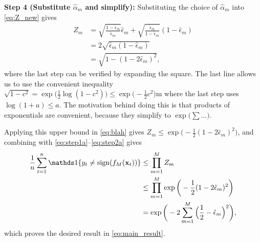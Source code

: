 \documentclass[english]{article}
\begin{document}
\medskip
{\noindent \bf Step 4 (Substitute $\hat{\alpha}_m$ and simplify):} Substituting the choice of $\hat{\alpha}_m$ into \eqref{eq:Z_new} gives
    \begin{align}
        Z_m &= \sqrt{\frac{1-\hat{\epsilon}_m}{\hat{\epsilon}_m}} \hat{\epsilon}_m + \sqrt{\frac{\hat{\epsilon}_m}{1-\hat{\epsilon}_m}}(1 - \hat{\epsilon}_m) \\
            &= 2\sqrt{ \hat{\epsilon}_m (1-\hat{\epsilon}_m) } \\
            &= \sqrt{ 1 - (1-2\hat{\epsilon}_m)^2 }, \label{eq:blah}
    \end{align}
    where the last step can be verified by expanding the square.  The last line allows us to use the convenient inequality $\sqrt{1-c^2} = \exp\big( \frac{1}{2}\log( 1 - c^2 ) \big) \le \exp\big( - \frac{1}{2} c^2 \big)$m where the last step uses $\log(1+a) \le a$.  The motivation behind doing this is that products of exponentials are convenient, because they simplify to $\exp\big(\sum\dotsc)$.

    Applying this upper bound in \eqref{eq:blah} gives $Z_m \le \exp\big( -\frac{1}{2} (1-2\hat{\epsilon}_m)^2 \big)$, and combining with \eqref{eq:step1a}--\eqref{eq:step2a} gives
    \begin{align*}
        \frac{1}{n}\sum_{t=1}^n\openone\{ y_t \ne \sign(f_M(\xv_t)) \} 
            &\le \prod_{m=1}^M Z_m \\
            &\le \prod_{m=1}^M \exp\bigg( -\frac{1}{2} (1-2\hat{\epsilon}_m)^2 \bigg) \\
            &= \exp\bigg( -2\sum_{m=1}^M \Big(\frac{1}{2}-\hat{\epsilon}_m\Big)^2 \bigg),
    \end{align*}
    which proves the desired result in \eqref{eq:main_result}.
\end{document}
